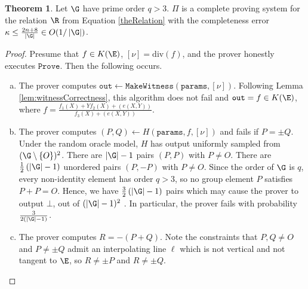 \documentclass[11pt,letterpaper]{article}
\theoremstyle{definition}
\newtheorem{theorem}{Theorem}
\newcommand{\6}{\mathbf}
\newcommand{\7}{\mathcal}
\begin{document}
\begin{theorem}\label{thm:DivisorCompleteness}
Let $\G$ have prime order $q > 3$. $\Pi$ is a complete proving system for the relation $\R$ from Equation \ref{theRelation} with the completeness error $\kappa \leq \frac{2n + 8}{\left|\G\right|} \in O(1/\left|\G\right|)$.
\end{theorem}
\begin{proof}
Presume that $f \in K(\E)$, $[\nu] = \text{div}(f)$, and the prover honestly executes $\texttt{Prove}$. Then the following occurs.
\begin{enumerate}[(a)]
\item The prover computes $\texttt{out} \leftarrow \texttt{MakeWitness}(\texttt{params},[\nu])$. Following Lemma \ref{lem:witnessCorrectness}, this algorithm does not fail and $\texttt{out} = f \in K(\E)$, where $f = \frac{f_1(X) + Yf_2(X) + (e(X,Y))}{f_3(X) + (e(X, Y))}$.
\item The prover computes $(P,Q) \leftarrow H(\texttt{params}, f, [\nu])$ and fails if $P = \pm Q$. Under the random oracle model, $H$ has output uniformly sampled from $(\G \setminus \left\{O\right\})^2$. There are $\left|\G\right| - 1$ pairs $(P, P)$ with $P \neq O$. There are $\frac{1}{2}\left(\left|\G\right| - 1\right)$ unordered pairs $(P, -P)$ with $P \neq O$. Since the order of $\G$ is $q$, every non-identity element has order $q > 3$, so no group element $P$ satisfies $P + P = O$. Hence,  we have $\frac{3}{2}\left(\left|\G\right| - 1\right)$ pairs which may cause the prover to output $\bot$, out of $(\left|\G\right|-1)^2$ . In particular, the prover fails with probability $\frac{3}{2\left(\left|\G\right|-1\right)}$.

\item The prover computes $R = -(P+Q)$. Note the constraints that $P, Q \neq O$ and $P \neq \pm Q$ admit an interpolating line $\ell$ which is not vertical and not tangent to $\E$, so $R \neq \pm P$ and $R \neq \pm Q$.


\end{enumerate}
\end{proof}
\end{document}
